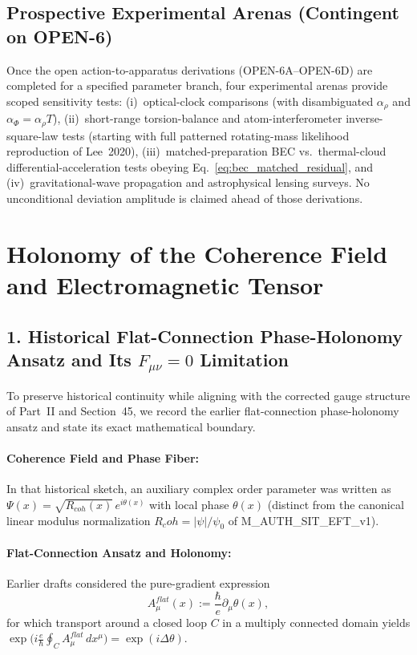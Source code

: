 \documentclass[american,11pt,letterpaper]{article}
\newcommand{\Rcoh}{R_{\mathrm{coh}}}
\def\mathcal#1{#1}%
\def\mathrm#1{#1}%
\def\texttt#1{#1}%
\def\Rcoh{R_coh}%
\begin{document}
\subsection{Prospective Experimental Arenas (Contingent on \texttt{OPEN-6})}

Once the open action-to-apparatus derivations (\texttt{OPEN-6A}--\texttt{OPEN-6D}) are completed for a specified parameter branch, four experimental arenas provide scoped sensitivity tests: (i)~optical-clock comparisons (with disambiguated $\alpha_\rho$ and $\alpha_\Phi = \alpha_\rho\mathcal{T}$), (ii)~short-range torsion-balance and atom-interferometer inverse-square-law tests (starting with full patterned rotating-mass likelihood reproduction of Lee~2020), (iii)~matched-preparation BEC vs.\ thermal-cloud differential-acceleration tests obeying Eq.~\eqref{eq:bec_matched_residual}, and (iv)~gravitational-wave propagation and astrophysical lensing surveys. No unconditional deviation amplitude is claimed ahead of those derivations.

\section{Holonomy of the Coherence Field and Electromagnetic Tensor}
\label{sec:HolonomyEM}

\subsection{1. Historical Flat-Connection Phase-Holonomy Ansatz and Its $F_{\mu\nu}=0$ Limitation}

To preserve historical continuity while aligning with the corrected gauge structure of Part~II and Section~45, we record the earlier flat-connection phase-holonomy ansatz and state its exact mathematical boundary.

\paragraph{Coherence Field and Phase Fiber:}
In that historical sketch, an auxiliary complex order parameter was written as $\Psi(x) = \sqrt{R_{\mathrm{coh}}(x)}\,e^{i\theta(x)}$ with local phase $\theta(x)$ (distinct from the canonical linear modulus normalization $\Rcoh = |\psi|/\psi_0$ of \texttt{M\_AUTH\_SIT\_EFT\_v1}).

\paragraph{Flat-Connection Ansatz and Holonomy:}
Earlier drafts considered the pure-gradient expression
\[
A_\mu^{\mathrm{flat}}(x) := \frac{\hbar}{e} \partial_\mu \theta(x),
\]
for which transport around a closed loop $C$ in a multiply connected domain yields $\exp\bigl(i\frac{e}{\hbar}\oint_C A_\mu^{\mathrm{flat}}\,dx^\mu\bigr) = \exp(i\Delta\theta)$.
\end{document}
